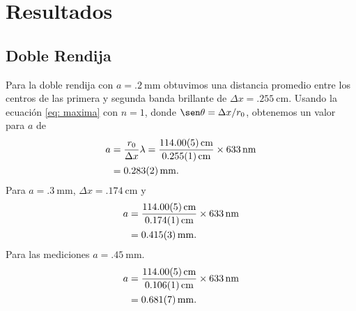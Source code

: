 \section{Resultados}
\subsection{Doble Rendija}
Para la doble rendija con $a = \qty{.2}{\mm}$ obtuvimos una distancia promedio entre los centros de las primera y segunda banda brillante de $\Delta x = \qty{.255}{\cm}$. Usando la ecuación \eqref{eq: maxima} con $n = 1$, donde $\sen \theta = \Delta x/r_0$, obtenemos un valor para $a$ de
\begin{equation}\label{eq: separation}
\begin{split}
	a &= \frac{r_0}{\Delta x} \lambda = \frac{\qty{114\pm.05}{cm}}{\qty{.255(1)}{\cm}}\times \qty{633}{\nm}\\
	&= \qty{.283(2)}{\mm}.
\end{split}
\end{equation}
Para $a = \qty{.3}{\mm}$, $\Delta x = \qty{.174}{\cm}$ y
\begin{equation}
\begin{split}
	a &= \frac{\qty{114\pm.05}{cm}}{\qty{.174(1)}{\cm}}\times \qty{633}{\nm}\\
	&= \qty{.415(3)}{\mm}.
\end{split}
\end{equation}
Para las mediciones $a =\qty{.45}{\mm}$.
\begin{equation}
\begin{split}
	a &= \frac{\qty{114\pm.05}{cm}}{\qty{.106(1)}{\cm}}\times \qty{633}{\nm}\\
	&= \qty{.681(7)}{\mm}.
\end{split}
\end{equation}

